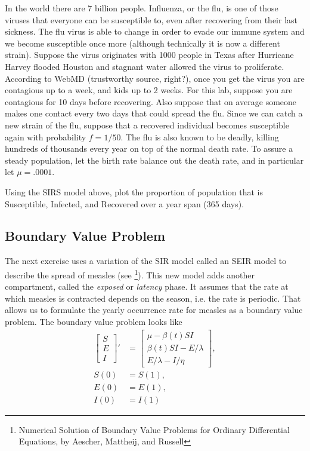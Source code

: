 \begin{problem}
In the world there are 7 billion people.
Influenza, or the flu, is one of those viruses that everyone can be susceptible to, even after recovering from their last sickness.
The flu virus is able to change in order to evade our immune system and we become susceptible once more (although technically it is now a different strain).
Suppose the virus originates with 1000 people in Texas after Hurricane Harvey flooded Houston and stagnant water allowed the virus to proliferate.
According to WebMD (trustworthy source, right?), once you get the virus you are contagious up to a week, and kids up to 2 weeks.
For this lab, suppose you are contagious for 10 days before recovering.
Also suppose that on average someone makes one contact every two days that could spread the flu.
Since we can catch a new strain of the flu, suppose that a recovered individual becomes susceptible again with probability $f=1/50$.
The flu is also known to be deadly, killing hundreds of thousands every year on top of the normal death rate.
To assure a steady population, let the birth rate balance out the death rate, and in particular let $\mu=.0001$.

Using the SIRS model above, plot the proportion of population that is Susceptible, Infected, and Recovered over a year span (365 days).
\end{problem}

\subsection*{Boundary Value Problem}

The next exercise uses a variation of the SIR model called an SEIR model to describe the spread of measles (see \footnote{Numerical Solution of Boundary Value Problems for Ordinary Differential Equations, by Aescher, Mattheij, and Russell}).
This new model adds another compartment, called the \emph{exposed} or \emph{latency} phase.
It assumes that the rate at which measles is contracted depends on the season, i.e. the rate is periodic.
That allows us to formulate the yearly occurrence rate for measles as a boundary value problem.
The boundary value problem looks like
\begin{align}\label{SEIR_BVP}
\left[\begin{array}{c}S \\ E \\ I\end{array}\right]' &= \left[\begin{array}{c}\mu - \beta(t) S I \\\beta(t) SI - E/\lambda \\E/\lambda - I/\eta\end{array}\right],\\
S(0) &= S(1),\\
E(0) &= E(1),\\
I(0) &= I(1)
\end{align}

